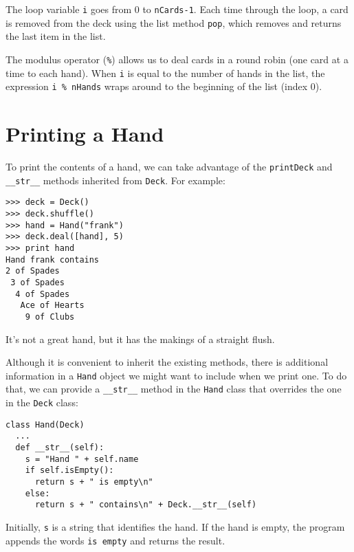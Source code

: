 
The loop variable {\tt i} goes from 0 to {\tt nCards-1}.  Each
time through the loop, a card is removed from the deck using the
list method {\tt pop}, which removes and returns the last item
in the list.


The modulus operator ({\tt \%}) allows us to deal cards in a
round robin (one card at a time to each hand).  When {\tt i} is
equal to the number of hands in the list, the expression
{\tt i \% nHands} wraps around to the beginning of the list
(index 0).



\section {Printing a Hand}

To print the contents of a hand, we can take advantage of
the {\tt printDeck} and {\tt \_\_str\_\_} methods inherited
from {\tt Deck}.  For example:

\pagebreak

\beforeverb
\begin{verbatim}
>>> deck = Deck()
>>> deck.shuffle()
>>> hand = Hand("frank")
>>> deck.deal([hand], 5)
>>> print hand
Hand frank contains
2 of Spades
 3 of Spades
  4 of Spades
   Ace of Hearts
    9 of Clubs
\end{verbatim}
\afterverb
%
It's not a great hand, but it has the makings
of a straight flush.


Although it is convenient to inherit the existing methods,
there is additional information in a {\tt Hand}
object we might want to include when we print one.  To do that,
we can provide a {\tt \_\_str\_\_} method in the {\tt Hand} class
that overrides the one in the {\tt Deck} class:

\beforeverb
\begin{verbatim}
class Hand(Deck)
  ...
  def __str__(self):
    s = "Hand " + self.name
    if self.isEmpty():
      return s + " is empty\n"
    else:
      return s + " contains\n" + Deck.__str__(self)
\end{verbatim}
\afterverb
%
Initially, {\tt s} is a string that identifies the hand.  If the hand
is empty, the program appends the words {\tt is empty} and returns the
result.

